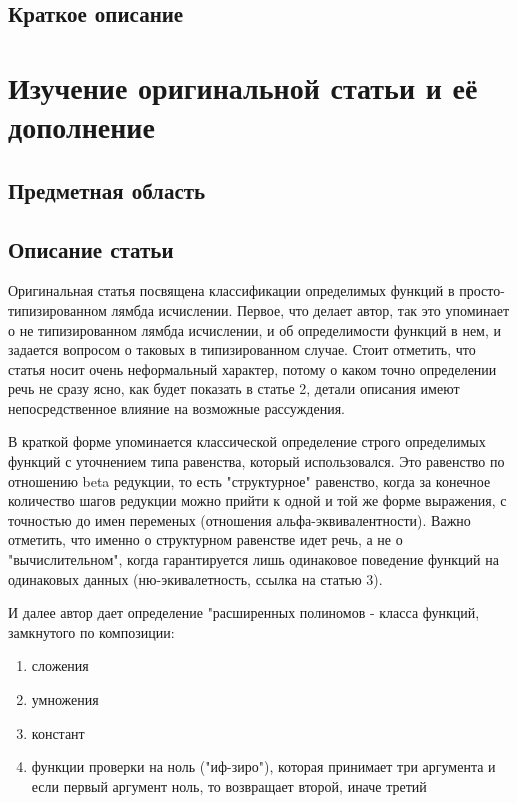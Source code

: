 \documentclass[times,specification,annotation]{itmo-student-thesis}
\begin{document}
\section{Краткое описание}
\todo
\chapter{Изучение оригинальной статьи и её дополнение}

\todo
\section{Предметная область}
\todo
\section{Описание статьи}
Оригинальная статья посвящена классификации определимых функций в просто-типизированном лямбда исчислении.
Первое, что делает автор, так это упоминает о не типизированном лямбда исчислении, и об определимости функций в нем, и задается
вопросом о таковых в типизированном случае. Стоит отметить, что статья носит
очень неформальный характер, потому о каком точно определении речь не сразу ясно,
как будет показать в статье 2, детали описания имеют непосредственное влияние на возможные рассуждения.

В краткой форме упоминается классической определение строго определимых функций с 
уточнением типа равенства, который использовался. Это равенство по отношению beta редукции, 
то есть "структурное" равенство, когда за конечное количество шагов редукции можно прийти к одной и той же форме выражения, с точностью до имен переменых (отношения альфа-эквивалентности).
Важно отметить, что именно о структурном равенстве идет речь, а не о "вычислительном", когда гарантируется
лишь одинаковое поведение функций на одинаковых данных (ню-экивалетность, ссылка на статью 3).

И далее автор дает определение "расширенных полиномов - класса функций, замкнутого по композиции:

\begin{enumerate}
    \item сложения
    \item умножения
    \item констант
    \item функции проверки на ноль ("иф-зиро"), которая принимает три аргумента и если первый 
    аргумент ноль, то возвращает второй, иначе третий
\end{enumerate}
\end{document}

